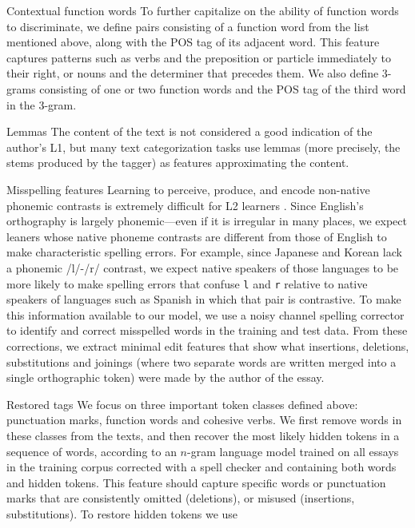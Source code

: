 \documentclass[11pt,letterpaper]{article}
\begin{document}
\begin{compactdesc}
\item[Contextual function words] To further capitalize on the ability
  of function words to discriminate, we define pairs consisting of a
  function word from the list mentioned above, along with the POS tag
  of its adjacent word. This feature captures patterns such as verbs
  and the preposition or particle immediately to their right, or nouns
  and the determiner that precedes them. We also define 3-grams
  consisting of one or two function words and the POS tag of the third
  word in the 3-gram.
\item[Lemmas] The content of the text is not considered a good
  indication of the author's L1, but many text categorization tasks
  use lemmas (more precisely, the stems produced by the tagger) as
  features approximating the content.
\item[Misspelling features] Learning to perceive, produce, and encode non-native phonemic contrasts is extremely difficult for L2 learners \citep{hayes-harb:2008}. Since English's orthography is largely phonemic---even if it is irregular in many places, we expect leaners whose native phoneme contrasts are different from those of English to make characteristic spelling errors. For example, since Japanese and Korean lack a phonemic /l/-/r/ contrast, we expect native speakers of those languages to be more likely to make spelling errors that confuse {\tt l} and {\tt r} relative to native speakers of languages such as Spanish in which that pair is contrastive. To make this information available to our model, we use a noisy channel spelling corrector \citep{kernighan:1990} to identify and correct misspelled words in the training and test data. From these corrections, we extract minimal edit features that show what insertions, deletions, substitutions and joinings (where two separate words are written merged into a single orthographic token) were made by the author of the essay.
\item[Restored tags] We focus on three important token classes defined
  above: punctuation marks, function words and cohesive verbs. We
  first remove words in these classes from the texts, and then recover
  the most likely hidden tokens in a sequence of words, according to
  an $n$-gram language model trained on all essays in the training
  corpus corrected with a spell checker and containing both words and
  hidden tokens. This feature should capture specific words or
  punctuation marks that are consistently omitted (deletions), or
  misused (insertions, substitutions). To restore hidden tokens we use

\end{compactdesc}
\end{document}

